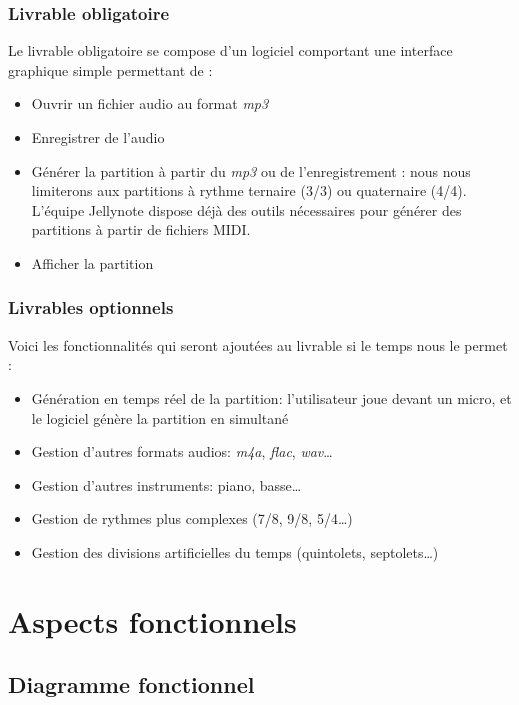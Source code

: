 \documentclass[12pt]{article}
\begin{document}
\subsubsection{Livrable obligatoire}

Le livrable obligatoire se compose d’un logiciel comportant une interface graphique simple permettant de :\\
\begin{itemize}
\item Ouvrir un fichier audio au format \emph{mp3}
\item Enregistrer de l’audio
\item Générer la partition à partir du \emph{mp3} ou de l’enregistrement : nous nous limiterons aux partitions à rythme ternaire (3/3) ou quaternaire (4/4).\\
L’équipe Jellynote dispose déjà des outils nécessaires pour générer des partitions à partir de fichiers MIDI.
\item Afficher la partition
\end{itemize}

\subsubsection{Livrables optionnels}

Voici les fonctionnalités qui seront ajoutées au livrable si le temps nous le permet :
\begin{itemize}
\item Génération en temps réel de la partition: l’utilisateur joue devant un micro, et le logiciel génère la partition en simultané
\item Gestion d’autres formats audios: \emph{m4a}, \emph{flac}, \emph{wav}…
\item Gestion d’autres instruments: piano, basse…
\item Gestion de rythmes plus complexes (7/8, 9/8, 5/4…)
\item Gestion des divisions artificielles du temps (quintolets, septolets…)
\end{itemize}

\newpage
\section{Aspects fonctionnels}

\subsection{Diagramme fonctionnel}
\end{document}
